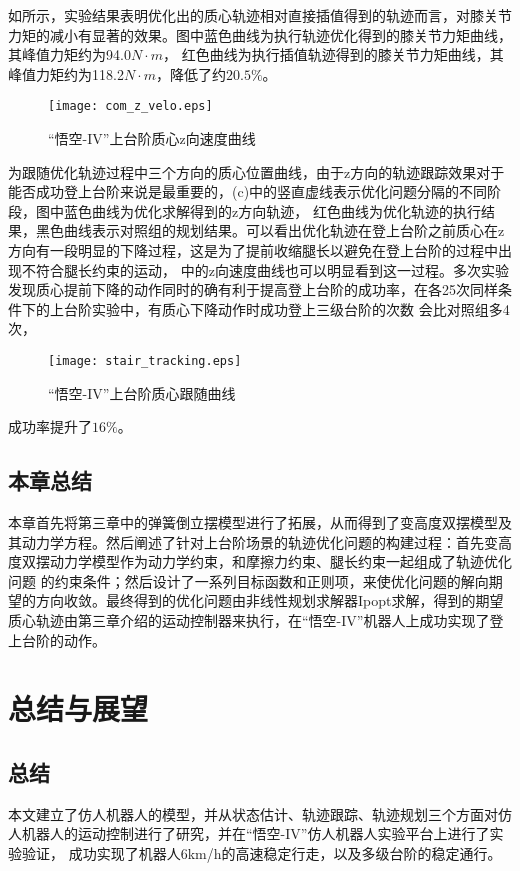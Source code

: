 如所示，实验结果表明优化出的质心轨迹相对直接插值得到的轨迹而言，对膝关节力矩的减小有显著的效果。图中蓝色曲线为执行轨迹优化得到的膝关节力矩曲线，其峰值力矩约为94.0$N\cdot m$，
红色曲线为执行插值轨迹得到的膝关节力矩曲线，其峰值力矩约为118.2$N\cdot m$，降低了约$20.5\%$。
\begin{figure}[h]
    \centering
    \texttt{[image: com\_z\_velo.eps]} 
    \caption{\label{fig:com_z_velo}“悟空-IV”上台阶质心z向速度曲线}
\end{figure}

为跟随优化轨迹过程中三个方向的质心位置曲线，由于z方向的轨迹跟踪效果对于能否成功登上台阶来说是最重要的，(c)中的竖直虚线表示优化问题分隔的不同阶段，图中蓝色曲线为优化求解得到的z方向轨迹，
红色曲线为优化轨迹的执行结果，黑色曲线表示对照组的规划结果。可以看出优化轨迹在登上台阶之前质心在z方向有一段明显的下降过程，这是为了提前收缩腿长以避免在登上台阶的过程中出现不符合腿长约束的运动，
中的z向速度曲线也可以明显看到这一过程。多次实验发现质心提前下降的动作同时的确有利于提高登上台阶的成功率，在各25次同样条件下的上台阶实验中，有质心下降动作时成功登上三级台阶的次数
会比对照组多4次，\begin{figure}[h]
    \centering
    \texttt{[image: stair\_tracking.eps]} 
    \caption{\label{fig:track_com}“悟空-IV”上台阶质心跟随曲线}
\end{figure}成功率提升了$16\%$。

\newpage
\section{本章总结}
本章首先将第三章中的弹簧倒立摆模型进行了拓展，从而得到了变高度双摆模型及其动力学方程。然后阐述了针对上台阶场景的轨迹优化问题的构建过程：首先变高度双摆动力学模型作为动力学约束，和摩擦力约束、腿长约束一起组成了轨迹优化问题
的约束条件；然后设计了一系列目标函数和正则项，来使优化问题的解向期望的方向收敛。最终得到的优化问题由非线性规划求解器Ipopt求解，得到的期望质心轨迹由第三章介绍的运动控制器来执行，在“悟空-IV”机器人上成功实现了登上台阶的动作。
\chapter{总结与展望}
\section{总结}
本文建立了仿人机器人的模型，并从状态估计、轨迹跟踪、轨迹规划三个方面对仿人机器人的运动控制进行了研究，并在“悟空-IV”仿人机器人实验平台上进行了实验验证，
成功实现了机器人6km/h的高速稳定行走，以及多级台阶的稳定通行。

